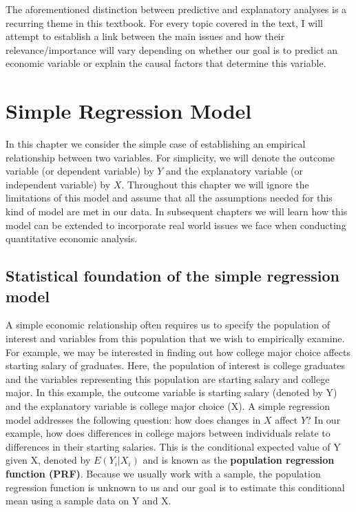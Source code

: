 \documentclass[
]{book}
\theoremstyle{definition}
\theoremstyle{definition}
\theoremstyle{definition}
\theoremstyle{definition}
\theoremstyle{remark}
\begin{document}
The aforementioned distinction between predictive and explanatory analyses is a recurring theme in this textbook. For every topic covered in the text, I will attempt to establish a link between the main issues and how their relevance/importance will vary depending on whether our goal is to predict an economic variable or explain the causal factors that determine this variable.

\hypertarget{simple-regression-model}{%
\chapter{Simple Regression Model}\label{simple-regression-model}}

In this chapter we consider the simple case of establishing an empirical relationship between two variables. For simplicity, we will denote the outcome variable (or dependent variable) by \(Y\) and the explanatory variable (or independent variable) by \(X\). Throughout this chapter we will ignore the limitations of this model and assume that all the assumptions needed for this kind of model are met in our data. In subsequent chapters we will learn how this model can be extended to incorporate real world issues we face when conducting quantitative economic analysis.

\hypertarget{statistical-foundation-of-the-simple-regression-model}{%
\section{Statistical foundation of the simple regression model}\label{statistical-foundation-of-the-simple-regression-model}}

A simple economic relationship often requires us to specify the population of interest and variables from this population that we wish to empirically examine. For example, we may be interested in finding out how college major choice affects starting salary of graduates. Here, the population of interest is college graduates and the variables representing this population are starting salary and college major. In this example, the outcome variable is starting salary (denoted by Y) and the explanatory variable is college major choice (X). A simple regression model addresses the following question: how does changes in \(X\) affect \(Y\)? In our example, how does differences in college majors between individuals relate to differences in their starting salaries. This is the conditional expected value of Y given X, denoted by \(E(Y_i|X_i)\) and is known as the \textbf{population regression function (PRF)}. Because we usually work with a sample, the population regression function is unknown to us and our goal is to estimate this conditional mean using a sample data on Y and X.
\end{document}
